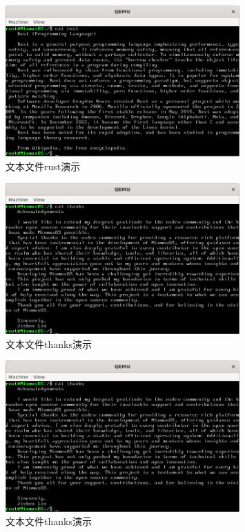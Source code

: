 \begin{figure}[htbp]
    \centering
    \includegraphics[width=0.8\textwidth]{figures/RustFilePresentation.png}
    \caption{文本文件rust演示}
\end{figure}

\begin{figure}[htbp]
    \centering
    \includegraphics[width=0.8\textwidth]{figures/ThanksFilePresentation.png}
    \caption{文本文件thanks演示}
\end{figure}

\begin{figure}[htbp]
    \centering
    \includegraphics[width=0.8\textwidth]{figures/ThanksFilePresentation.png}
    \caption{文本文件thanks演示}
\end{figure}

